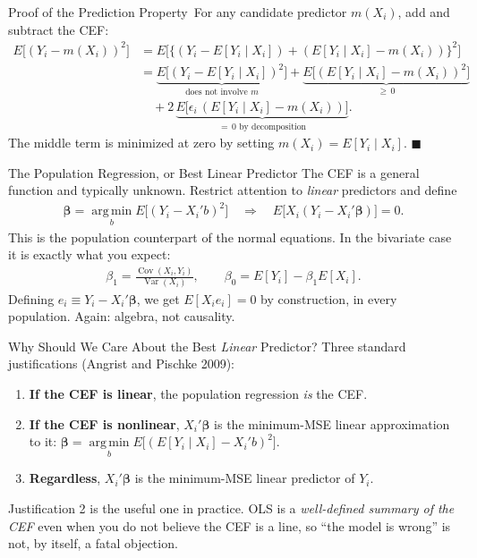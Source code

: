 \documentclass[aspectratio=169,11pt,xcolor=dvipsnames]{beamer}
\newcommand{\srcp}[1]{{\scriptsize\color{gray}(#1)}}   %
\DeclareMathOperator*{\argminop}{arg\,min}
\newcommand{\argmin}{\argminop\limits}
\DeclareMathOperator{\Cov}{Cov}
\DeclareMathOperator{\Var}{Var}
\newcommand{\E}{E}
\newcommand{\adv}{\,\raisebox{0.6pt}{\textcolor{accent}{$\bigstar$}}}
\begin{document}
\begin{frame}{Proof of the Prediction Property\adv}
For any candidate predictor $m(X_i)$, add and subtract the CEF:
\begin{align*}
  \E\big[(Y_i - m(X_i))^2\big]
  &= \E\Big[\big\{ (Y_i - \E[Y_i\mid X_i]) + (\E[Y_i\mid X_i] - m(X_i)) \big\}^2\Big]\\[2pt]
  &= \underbrace{\E\big[(Y_i-\E[Y_i\mid X_i])^2\big]}_{\text{does not involve } m}
   + \underbrace{\E\big[(\E[Y_i\mid X_i] - m(X_i))^2\big]}_{\geq\, 0}\\
  &\quad + 2\,\underbrace{\E\big[\epsilon_i\,(\E[Y_i\mid X_i]-m(X_i))\big]}_{=\,0
    \text{ by decomposition}} .
\end{align*}
The middle term is minimized at zero by setting $m(X_i)=\E[Y_i\mid X_i]$.
$\blacksquare$
\end{frame}

\begin{frame}{The Population Regression, or Best Linear Predictor}
The CEF is a general function and typically unknown. Restrict attention to
\emph{linear} predictors and define
\begin{align*}
  \bm\beta = \argmin_{b} \E\big[(Y_i - X_i'b)^2\big]
  \quad\Longrightarrow\quad
  \E\big[X_i(Y_i - X_i'\bm\beta)\big] = 0 .
\end{align*}
This is the population counterpart of the normal equations. In the bivariate case
it is exactly what you expect:
\begin{align*}
  \beta_1 = \frac{\Cov(X_i, Y_i)}{\Var(X_i)},
  \qquad
  \beta_0 = \E[Y_i] - \beta_1 \E[X_i] .
\end{align*}
\vskip4pt
Defining $e_i \equiv Y_i - X_i'\bm\beta$, we get $\E[X_ie_i]=0$
\alert{by construction}, in every population. Again: algebra, not causality.
\end{frame}

\begin{frame}{Why Should We Care About the Best \emph{Linear} Predictor?}
Three standard justifications \srcp{Angrist and Pischke 2009}:
\begin{enumerate}\itemsep6pt
  \item \textbf{If the CEF is linear}, the population regression \emph{is} the CEF.
  \item \textbf{If the CEF is nonlinear}, $X_i'\bm\beta$ is the minimum-MSE linear
        approximation to it:
        $\bm\beta = \argmin_b \E\big[(\E[Y_i\mid X_i] - X_i'b)^2\big]$.
  \item \textbf{Regardless}, $X_i'\bm\beta$ is the minimum-MSE linear predictor
        of $Y_i$.
\end{enumerate}
\vskip6pt
\pause
Justification 2 is the useful one in practice. OLS is a \emph{well-defined
summary of the CEF} even when you do not believe the CEF is a line, so
``the model is wrong'' is not, by itself, a fatal objection.
\end{frame}
\end{document}

